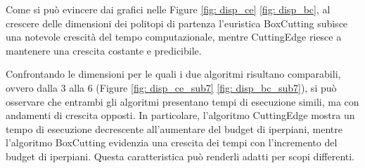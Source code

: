 Come si può evincere dai grafici nelle Figure \ref{fig: disp_ce} \ref{fig: disp_bc},
al crescere delle dimensioni dei politopi di partenza l'euristica BoxCutting 
subisce una notevole crescità del tempo computazionale, mentre CuttingEdge 
riesce a mantenere una crescita costante e predicibile.

Confrontando le dimensioni per le quali i due algoritmi risultano comparabili, 
ovvero dalla 3 alla 6 (Figure \ref{fig: disp_ce_sub7} \ref{fig: disp_bc_sub7}), 
si può osservare che entrambi gli algoritmi 
presentano tempi di esecuzione simili, ma con andamenti di crescita opposti. 
In particolare, l'algoritmo CuttingEdge mostra un tempo di esecuzione decrescente 
all'aumentare del budget di iperpiani, mentre l'algoritmo BoxCutting evidenzia 
una crescita dei tempi con l'incremento del budget di iperpiani. 
Questa caratteristica può renderli adatti per scopi differenti.\\

